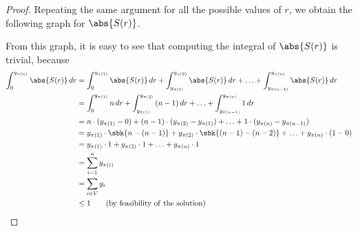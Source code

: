 \documentclass[a4paper, 12pt]{report}
\begin{document}
\begin{proof}
{            Repeating the same argument for all the possible values of $r$, we obtain the following graph for $\abs{S(r)}$.

            \begin{figure}[H]
                \centering
            \end{figure}

            From this graph, it is easy to see that computing the integral of $\abs{S(r)}$ is trivial, because
            \begin{equation*}
                \begin{split}
                    \int_{0}^{y_{\pi(n)}}{\abs{S(r)} \, d r} &= \int_{0}^{y_{\pi(1)}}{\abs{S(r)} \, dr} + \int_{y_{\pi(1)}}^{y_{\pi(2)}}{\abs{S(r)} \, dr} + \ldots + \int_{y_{\pi(n -1)}}^{y_{\pi(n)}}{\abs{S(r)} \, dr} \\
                                                             &= \int_{0}^{y_{\pi(1)}}{n \, dr} + \int_{y_{\pi(1)}}^{y_{\pi(2)}}{(n - 1) \, dr} + \ldots + \int_{y_{\pi(n - 1)}}^{y_{\pi(n)}}{1 \, dr} \\
                                                             &= n \cdot (y_{\pi(1)} - 0) + (n - 1) \cdot(y_{\pi(2)} - y_{\pi(1)}) + \ldots + 1 \cdot (y_{\pi(n)} - y_{\pi(n - 1)}) \\
                                                             &= y_{\pi(1)} \cdot\sbk{n - (n - 1)} + y_{\pi(2)}\cdot \sbk{(n - 1) - (n - 2)} + \ldots + y_{\pi(n)}\cdot (1 - 0) \\
                                                             &= y_{\pi(1)} \cdot 1 + y_{\pi(2)} \cdot 1 + \ldots + y_{\pi(n)} \cdot 1 \\
                                                             &= \sum_{i = 1}^n{y_{\pi(i)}} \\
                                                             &= \sum_{i \in V}{y_i} \\
                                                             &\le 1 \quad\quad (\mathrm{by \ feasibility \ of \ the \ solution})
                \end{split}
            \end{equation*}

}
\end{proof}
\end{document}
